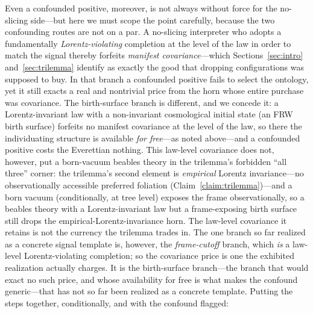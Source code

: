 \documentclass[11pt]{article}
\theoremstyle{remark}
\begin{document}
Even a confounded positive, moreover, is not always without force for
the no-slicing side---but here we must scope the point carefully,
because the two confounding routes are not on a par. A no-slicing
interpreter who adopts a fundamentally \emph{Lorentz-violating}
completion at the level of the law in order to match the signal thereby
forfeits \emph{manifest covariance}---which
Sections~\ref{sec:intro} and~\ref{sec:trilemma} identify as exactly the
good that dropping configurations was supposed to buy. In that branch a
confounded positive fails to select the ontology, yet it still exacts a
real and nontrivial price from the horn whose entire purchase was
covariance. The birth-surface branch is different, and we concede it:
a Lorentz-invariant law with a non-invariant cosmological initial state
(an FRW birth surface) forfeits no manifest covariance at the level of
the law, so there the individuating structure is available \emph{for
free}---as noted above---and a confounded positive costs the Everettian
nothing. This law-level covariance does not, however, put a born-vacuum
beables theory in the trilemma's forbidden ``all three'' corner: the
trilemma's second element is \emph{empirical} Lorentz invariance---no
observationally accessible preferred foliation
(Claim~\ref{claim:trilemma})---and a born vacuum (conditionally, at tree
level) exposes the frame observationally, so a beables theory with a
Lorentz-invariant law but a frame-exposing birth surface still drops the
empirical-Lorentz-invariance horn. The law-level covariance it retains
is not the currency the trilemma trades in. The one branch so far
realized as a concrete signal template is, however, the
\emph{frame-cutoff} branch, which \emph{is} a law-level
Lorentz-violating completion; so the covariance price is one the
exhibited realization actually charges. It is the birth-surface
branch---the branch that would exact no such price, and whose
availability for free is what makes the confound generic---that has
not so far been realized as a concrete template. Putting the
steps together, conditionally, and with the confound flagged:
\end{document}
